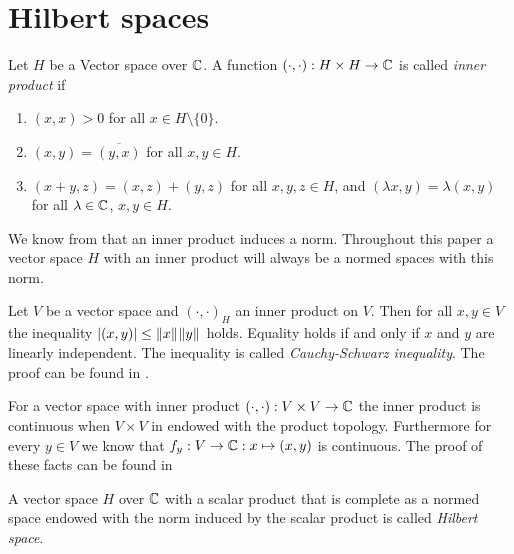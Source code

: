\section{Hilbert spaces}

\begin{definition}
	Let $H$ be a Vector space over $\mathbb{C}$. A function $(\cdot, \cdot): H \times H \to \mathbb{C}$ is called \textit{inner product} if 
	\begin{enumerate}
		\item $(x,x) > 0$ for all $x \in H \setminus \{0\}$.
		\item $(x,y) = \overline{(y,x)}$ for all $x,y \in H$.
		\item $(x + y, z) = (x,z) + (y,z)$ for all $x,y,z \in H$, and $(\lambda x, y) = \lambda (x,y)$ for all $\lambda \in \mathbb{C}$, $x,y \in H$. 
	\end{enumerate}
\end{definition}


\begin{remark}
	We know from \cite[p.41]{FAna1} that an inner product induces a norm. Throughout this paper a vector space $H$ with an inner product will always be a normed spaces with this norm.
\end{remark}


\begin{remark} \label{remark:csb}
	Let $V$ be a vector space and $(\cdot, \cdot)_H$ an inner product on $V$. Then for all $x,y \in V$ the inequality ${\left | (x,y) \right |} \leq {\left \| x \right \|}_{} {\left \| y \right \|}_{}$ holds. Equality holds if and only if $x$ and $y$ are linearly independent. The inequality is called \textit{Cauchy-Schwarz inequality}. The proof can be found in \cite[p. 41]{FAna1}.
\end{remark}


\begin{remark}
	For a vector space with inner product $(\cdot, \cdot): V \times V \to \mathbb{C}$ the inner product is continuous when $V \times V$ in endowed with the product topology. Furthermore for every $y \in V$ we know that $f_y:V \to \mathbb{C}: x \mapsto (x,y)$ is continuous. The proof of these facts can be found in \cite[p.43]{FAna1} 
\end{remark}

\begin{definition}
	A vector space $H$ over $\mathbb{C}$ with a scalar product that is complete as a normed space endowed with the norm induced by the scalar product is called \textit{Hilbert space}.
\end{definition}

